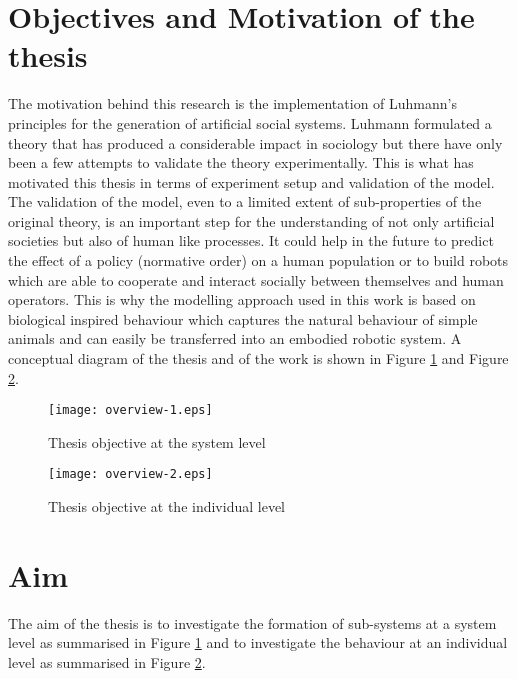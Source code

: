 \section{Objectives and Motivation of the thesis}
The motivation behind this research is the implementation of Luhmann's
principles for the generation of artificial social systems.
Luhmann formulated a theory that has produced a considerable
impact in sociology but there have only been a few attempts to validate
the theory experimentally.
This is what has motivated this thesis in terms of experiment setup and
validation of the model.
The validation of the model, even to a limited extent of sub-properties of the
original theory, is an important step for the understanding of not only
artificial societies but also of human like processes.
It could help in the future to predict the effect of a policy (normative order)
on a human population or to build robots which are able to cooperate and
interact socially between themselves and human operators.
This is why the modelling approach used in this work is based on biological
inspired behaviour which captures the natural behaviour of simple animals and
can easily be transferred into an embodied robotic system.
A conceptual diagram of the thesis and of the work is shown in 
Figure \ref{fig:overview-1} and Figure \ref{fig:overview-2}.

\begin{figure}[htbp]
\begin{center}
\texttt{[image: overview-1.eps]}
\end{center}
\small{
\caption[Thesis research aim system]{Thesis objective at the system level \label{fig:overview-1}}}
\end{figure}

\begin{figure}[htbp]
\begin{center}
\texttt{[image: overview-2.eps]}
\end{center}
\small{
\caption[Thesis research aim individual]{Thesis objective at the individual level \label{fig:overview-2}}}
\end{figure}

\section{Aim}

The aim of the thesis is to investigate the formation of sub-systems at a
system level as summarised in Figure \ref{fig:overview-1} and to
investigate the behaviour at an individual level as summarised in Figure \ref{fig:overview-2}.

